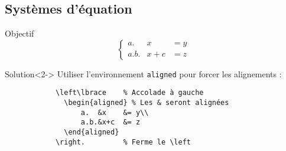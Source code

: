 \documentclass[svgnames,smaller]{beamer}
\begin{document}
	\subsection{Systèmes d'équation}
\begin{frame}[fragile]
	\begin{exampleblock}{Objectif}
		\begin{equation}
			\left\lbrace
			\begin{aligned}
				a.&x	&= y\\
				a.b.&x+c	&= z
			\end{aligned}			 
			\right.
		\end{equation}
	\end{exampleblock}
	
	\begin{block}{Solution}<2->
	Utiliser l'environnement \texttt{aligned} pour forcer les alignements :
		\begin{lstlisting}
			\left\lbrace	% Accolade à gauche
			  \begin{aligned} % Les & seront alignées
				  a.  &x    &= y\\
				  a.b.&x+c  &= z
			  \end{aligned}			 
			\right.			% Ferme le \left
		\end{lstlisting}
	\end{block}
\end{frame}
\end{document}
